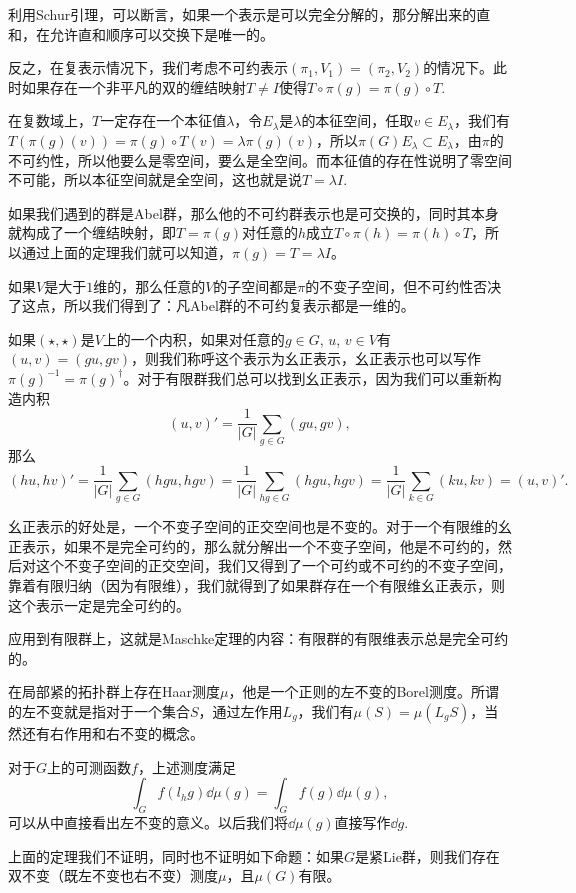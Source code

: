\documentclass[9pt]{extarticle}
\begin{document}
利用Schur引理，可以断言，如果一个表示是可以完全分解的，那分解出来的直和，在允许直和顺序可以交换下是唯一的。

\para 反之，在复表示情况下，我们考虑不可约表示$(\pi_1,V_1)=(\pi_2,V_2)$的情况下。此时如果存在一个非平凡的双的缠结映射$T\neq I$使得$T\circ \pi(g)=\pi(g)\circ T$.

在复数域上，$T$一定存在一个本征值$\lambda$，令$E_\lambda$是$\lambda$的本征空间，任取$v\in E_\lambda$，我们有$T(\pi(g)(v))=\pi(g)\circ T(v)=\lambda\pi(g)(v)$，所以$\pi(G)E_\lambda\subset E_\lambda$，由$\pi$的不可约性，所以他要么是零空间，要么是全空间。而本征值的存在性说明了零空间不可能，所以本征空间就是全空间，这也就是说$T=\lambda I$.

\para 如果我们遇到的群是Abel群，那么他的不可约群表示也是可交换的，同时其本身就构成了一个缠结映射，即$T=\pi(g)$对任意的$h$成立$T\circ \pi(h)=\pi(h)\circ T$，所以通过上面的定理我们就可以知道，$\pi(g)=T=\lambda I$。

如果$V$是大于$1$维的，那么任意的$V$的子空间都是$\pi$的不变子空间，但不可约性否决了这点，所以我们得到了：凡Abel群的不可约复表示都是一维的。

\para 如果$(\star,\star)$是$V$上的一个内积，如果对任意的$g\in G$, $u$, $v\in V$有$(u,v)=(gu,gv)$，则我们称呼这个表示为幺正表示，幺正表示也可以写作$\pi(g)^{-1}=\pi(g)^\dag$。对于有限群我们总可以找到幺正表示，因为我们可以重新构造内积
\[
	(u,v)'=\frac{1}{|G|}\sum_{g\in G}(gu,gv),
\]
那么
\[
	(hu,hv)'=\frac{1}{|G|}\sum_{g\in G}(hgu,hgv)=\frac{1}{|G|}\sum_{hg\in G}(hgu,hgv)=\frac{1}{|G|}\sum_{k\in G}(ku,kv)=(u,v)'.
\]

幺正表示的好处是，一个不变子空间的正交空间也是不变的。对于一个有限维的幺正表示，如果不是完全可约的，那么就分解出一个不变子空间，他是不可约的，然后对这个不变子空间的正交空间，我们又得到了一个可约或不可约的不变子空间，靠着有限归纳（因为有限维），我们就得到了如果群存在一个有限维幺正表示，则这个表示一定是完全可约的。

应用到有限群上，这就是Maschke定理的内容：有限群的有限维表示总是完全可约的。 

\theo 在局部紧的拓扑群上存在Haar测度$\mu$，他是一个正则的左不变的Borel测度。所谓的左不变就是指对于一个集合$S$，通过左作用$L_g$，我们有$\mu(S)=\mu(L_gS)$，当然还有右作用和右不变的概念。

对于$G$上的可测函数$f$，上述测度满足
\[
	\int_G f(l_h g)\dd \mu(g)=\int_G f(g)\dd \mu(g),
\]
可以从中直接看出左不变的意义。以后我们将$\dd \mu(g)$直接写作$\dd g$.

上面的定理我们不证明，同时也不证明如下命题：如果$G$是紧Lie群，则我们存在双不变（既左不变也右不变）测度$\mu$，且$\mu(G)$有限。
\end{document}

